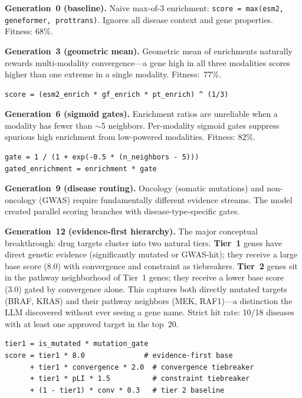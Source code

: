 \documentclass[sigconf, nonacm]{acmart}
\begin{document}
\textbf{Generation~0 (baseline).} Naive max-of-3 enrichment: \texttt{score = max(esm2, geneformer, prottrans)}. Ignores all disease context and gene properties. Fitness: 68\%.

\textbf{Generation~3 (geometric mean).} Geometric mean of enrichments naturally rewards multi-modality convergence---a gene high in all three modalities scores higher than one extreme in a single modality. Fitness:~77\%.
\begin{lstlisting}
score = (esm2_enrich * gf_enrich * pt_enrich) ^ (1/3)
\end{lstlisting}
\vspace{-0.5em}

\textbf{Generation~6 (sigmoid gates).} Enrichment ratios are unreliable when a modality has fewer than $\sim$5 neighbors. Per-modality sigmoid gates suppress spurious high enrichment from low-powered modalities. Fitness: 82\%.
\begin{lstlisting}
gate = 1 / (1 + exp(-0.5 * (n_neighbors - 5)))
gated_enrichment = enrichment * gate
\end{lstlisting}
\vspace{-0.5em}

\textbf{Generation~9 (disease routing).} Oncology (somatic mutations) and non-oncology (GWAS) require fundamentally different evidence streams. The model created parallel scoring branches with disease-type-specific gates.

\textbf{Generation~12 (evidence-first hierarchy).} The major conceptual breakthrough: drug targets cluster into two natural tiers. \textbf{Tier~1} genes have direct genetic evidence (significantly mutated or GWAS-hit); they receive a large base score (8.0) with convergence and constraint as tiebreakers. \textbf{Tier~2} genes sit in the pathway neighborhood of Tier~1 genes; they receive a lower base score (3.0) gated by convergence alone. This captures both directly mutated targets (BRAF, KRAS) and their pathway neighbors (MEK, RAF1)---a distinction the LLM discovered without ever seeing a gene name. Strict hit rate: 10/18 diseases with at least one approved target in the top~20.
\begin{lstlisting}
tier1 = is_mutated * mutation_gate
score = tier1 * 8.0              # evidence-first base
      + tier1 * convergence * 2.0  # convergence tiebreaker
      + tier1 * pLI * 1.5          # constraint tiebreaker
      + (1 - tier1) * conv * 0.3   # tier 2 baseline
\end{lstlisting}
\vspace{-0.5em}
\end{document}
